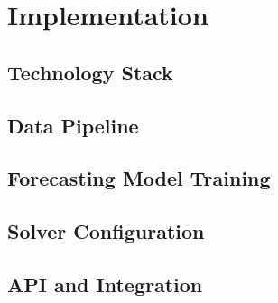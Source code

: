 \chapter{Implementation}
\label{chap:implementation}

\section{Technology Stack}
\label{sec:tech_stack}


\section{Data Pipeline}
\label{sec:data_pipeline}


\section{Forecasting Model Training}
\label{sec:model_training}


\section{Solver Configuration}
\label{sec:solver}


\section{API and Integration}
\label{sec:api}

